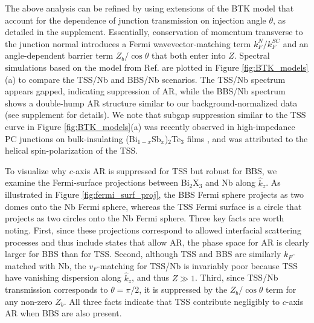 \documentclass[aps,prl,twocolumn,showpacs,amsmath,amssymb,superscriptaddress,citeautoscript]{revtex4-1}
\begin{document}
The above analysis can be refined by using extensions of the BTK model \cite{Tanaka1995,Mortensen1999,Daghero2011} that account for the dependence of junction transmission on injection angle $\theta$, as detailed in the supplement.  Essentially, conservation of momentum transverse to the junction normal introduces a Fermi wavevector-matching term $k^N_F / k^{SC}_F$ and an angle-dependent barrier term $Z_{b}/\cos\theta$ that both enter into $Z$.  Spectral simulations based on the model from Ref. \cite{Mortensen1999} are plotted in Figure \ref{fig:BTK_models}(a) to compare the TSS/Nb and BBS/Nb scenarios.  The TSS/Nb spectrum appears gapped, indicating suppression of AR, while the BBS/Nb spectrum shows a double-hump AR structure similar to our background-normalized data (see supplement for details). We note that subgap suppression similar to the TSS curve in Figure \ref{fig:BTK_models}(a) was recently observed in high-impedance PC junctions on bulk-insulating (Bi$_{1-x}$Sb$_x$)$_2$Te$_3$ films \cite{Borisov2016}, and was attributed to the helical spin-polarization of the TSS.

To visualize why $c$-axis AR is suppressed for TSS but robust for BBS, we examine the Fermi-surface projections between Bi$_{2}$X$_{3}$ and Nb along $\hat{k}_z$.  As illustrated in Figure \ref{fig:fermi_surf_proj}, the BBS Fermi sphere projects as two domes onto the Nb Fermi sphere, whereas the TSS Fermi surface is a circle that projects as two circles onto the Nb Fermi sphere.  Three key facts are worth noting. First, since these projections correspond to allowed interfacial scattering processes and thus include states that allow AR, the phase space for AR is clearly larger for BBS than for TSS.  Second, although TSS and BBS are similarly $k_F$-matched with Nb, the $v_F$-matching for TSS/Nb is invariably poor because TSS have vanishing dispersion along $\hat{k}_z$, and thus $Z\gg1$.  Third, since TSS/Nb transmission corresponds to $\theta=\pi /2 $, it is suppressed by the $Z_{b}/\cos\theta$ term for any non-zero $Z_b$.  All three facts indicate that TSS contribute negligibly to $c$-axis AR when BBS are also present.
\end{document}

